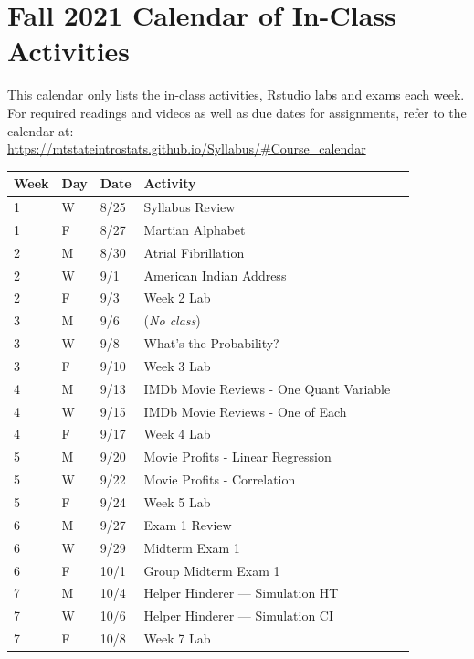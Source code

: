 \documentclass[
]{report}
\begin{document}
\nocite{*}

\hypertarget{fall-2021-calendar-of-in-class-activities}{%
\chapter*{Fall 2021 Calendar of In-Class Activities}\label{fall-2021-calendar-of-in-class-activities}}

This calendar only lists the in-class activities, Rstudio labs and exams each week. For required readings and videos as well as due dates for assignments, refer to the calendar at:\\
\href{new\%20calendar}{https://mtstateintrostats.github.io/Syllabus/\#Course\_calendar}

\begin{longtable}{|l|l|l|l|p{}|}
\hline
\textbf{Week}& \textbf{Day}& \textbf{Date}& \textbf{Activity} \\ \hline
\endhead
1& W& 8/25& Syllabus Review \\*
1& F& 8/27& Martian Alphabet \\ \hline
2& M& 8/30& Atrial Fibrillation \\*
2& W& 9/1& American Indian Address \\* 
2& F& 9/3& Week 2 Lab \\ \hline
3& M& 9/6& (\textit{No class}) \\*
3& W& 9/8& What's the Probability? \\*
3& F& 9/10& Week 3 Lab \\ \hline
4& M& 9/13& IMDb Movie Reviews - One Quant Variable \\*
4& W& 9/15& IMDb Movie Reviews - One of Each \\*
4& F& 9/17& Week 4 Lab \\ \hline
5& M& 9/20& Movie Profits - Linear Regression \\*
5& W& 9/22& Movie Profits - Correlation \\* 
5& F& 9/24& Week 5 Lab \\ \hline
6& M& 9/27& Exam 1 Review \\*
6& W& 9/29& Midterm Exam 1 \\*  
6& F& 10/1& Group Midterm Exam 1 \\ \hline
7& M& 10/4& Helper Hinderer --- Simulation HT \\*
7& W& 10/6& Helper Hinderer --- Simulation CI \\*
7& F& 10/8& Week 7 Lab \\ \hline

\end{longtable}
\end{document}
